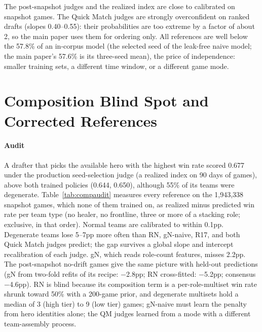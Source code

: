 \documentclass[journal]{IEEEtran}
\begin{document}
The post-snapshot judges and the realized index are close to calibrated on snapshot games. The Quick Match judges are strongly overconfident on ranked drafts (slopes 0.40--0.55): their probabilities are too extreme by a factor of about 2, so the main paper uses them for ordering only. All references are well below the 57.8\% of an in-corpus model (the selected seed of the leak-free naive model; the main paper's 57.6\% is its three-seed mean), the price of independence: smaller training sets, a different time window, or a different game mode.


\section{Composition Blind Spot and Corrected References}
\label{sec:compjudge}

\paragraph{Audit} A drafter that picks the available hero with the highest win rate scored 0.677 under the production seed-selection judge (a realized index on 90 days of games), above both trained policies (0.644, 0.650), although 55\% of its teams were degenerate. Table~\ref{tab:compaudit} measures every reference on the 1,943,338 snapshot games, which none of them trained on, as realized minus predicted win rate per team type (no healer, no frontline, three or more of a stacking role; exclusive, in that order). Normal teams are calibrated to within 0.1pp. Degenerate teams lose 5--7pp more often than RN, gN-naive, R17, and both Quick Match judges predict; the gap survives a global slope and intercept recalibration of each judge. gN, which reads role-count features, misses 2.2pp. The post-snapshot no-drift games give the same picture with held-out predictions (gN from two-fold refits of its recipe: $-$2.8pp; RN cross-fitted: $-$5.2pp; consensus $-$4.6pp). RN is blind because its composition term is a per-role-multiset win rate shrunk toward 50\% with a 200-game prior, and degenerate multisets hold a median of 3 (high tier) to 9 (low tier) games; gN-naive must learn the penalty from hero identities alone; the QM judges learned from a mode with a different team-assembly process.
\end{document}

